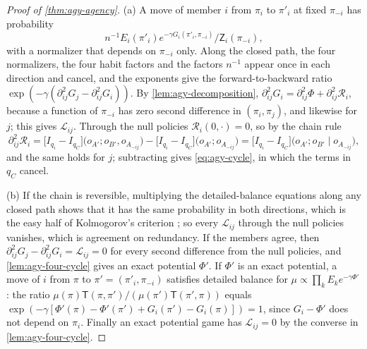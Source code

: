 \begin{proof}[Proof of \cref{thm:agy-agency}]
(a) A move of member $i$ from $\pi_i$ to $\pi'_i$ at fixed $\pi_{-i}$ has probability
\begin{equation*}
n^{-1}E_i(\pi'_i)e^{-\gamma G_i(\pi'_i,\pi_{-i})}/\mathsf Z_i(\pi_{-i}),
\end{equation*}
with a normalizer that depends on $\pi_{-i}$ only. Along the closed path, the four normalizers, the four habit factors and the factors $n^{-1}$ appear once in each direction and cancel, and the exponents give the forward-to-backward ratio $\exp(-\gamma(\partial^2_{ij}G_j-\partial^2_{ij}G_i))$. By \cref{lem:agy-decomposition}, $\partial^2_{ij}G_i=\partial^2_{ij}\Phi+\partial^2_{ij}\mathcal R_i$, because a function of $\pi_{-i}$ has zero second difference in $(\pi_i,\pi_j)$, and likewise for $j$; this gives $\mathcal L_{ij}$. Through the null policies $\mathcal R_i(0,\cdot)=0$, so by the chain rule
\begin{equation*}
\partial^2_{ij}\mathcal R_i=\bigl[I_{q_i}-I_{q_C}\bigr]\bigl(o_{A'};o_{B'},o_{A_{-ij}}\bigr)-\bigl[I_{q_i}-I_{q_C}\bigr]\bigl(o_{A'};o_{A_{-ij}}\bigr)=\bigl[I_{q_i}-I_{q_C}\bigr]\bigl(o_{A'};o_{B'}\mid o_{A_{-ij}}\bigr),
\end{equation*}
and the same holds for $j$; subtracting gives \eqref{eq:agy-cycle}, in which the terms in $q_C$ cancel.

(b) If the chain is reversible, multiplying the detailed-balance equations along any closed path shows that it has the same probability in both directions, which is the easy half of Kolmogorov's criterion \citep{kelly1979reversibility}; so every $\mathcal L_{ij}$ through the null policies vanishes, which is agreement on redundancy. If the members agree, then $\partial^2_{ij}G_j-\partial^2_{ij}G_i=\mathcal L_{ij}=0$ for every second difference from the null policies, and \cref{lem:agy-four-cycle} gives an exact potential $\Phi'$. If $\Phi'$ is an exact potential, a move of $i$ from $\pi$ to $\pi'=(\pi'_i,\pi_{-i})$ satisfies detailed balance for $\mu\propto\prod_kE_ke^{-\gamma\Phi'}$: the ratio $\mu(\pi)\mathsf T(\pi,\pi')/(\mu(\pi')\mathsf T(\pi',\pi))$ equals $\exp(-\gamma[\Phi'(\pi)-\Phi'(\pi')+G_i(\pi')-G_i(\pi)])=1$, since $G_i-\Phi'$ does not depend on $\pi_i$. Finally an exact potential game has $\mathcal L_{ij}=0$ by the converse in \cref{lem:agy-four-cycle}.


\end{proof}
